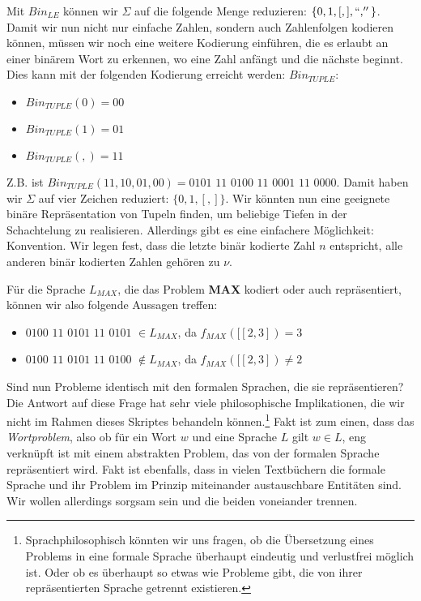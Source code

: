 Mit $Bin_{LE}$ können wir $\Sigma$ auf die folgende Menge reduzieren: $\{0, 1, [, ], ``,''\}$.
Damit wir nun nicht nur einfache Zahlen, sondern auch Zahlenfolgen kodieren können,
müssen wir noch eine weitere Kodierung einführen,
die es erlaubt an einer binärem Wort zu erkennen,
wo eine Zahl anfängt und die nächste beginnt.
Dies kann mit der folgenden Kodierung erreicht werden: 
$Bin_{TUPLE}:$ 

\begin{itemize}
    \item $Bin_{TUPLE}(0) = 00$
    \item $Bin_{TUPLE}(1) = 01$
    \item $Bin_{TUPLE}(,) = 11$
\end{itemize}
Z.B. ist $Bin_{TUPLE}(11,10,01,00) = 0101$ $11$ $0100$ $11$ $0001$ $11$ $0000$.
Damit haben wir $\Sigma$ auf vier Zeichen reduziert: $\{0,1,[,]\}$.
Wir könnten nun eine geeignete binäre Repräsentation von Tupeln finden,
um beliebige Tiefen in der Schachtelung zu realisieren.
Allerdings gibt es eine einfachere Möglichkeit: Konvention.
Wir legen fest, dass die letzte binär kodierte Zahl $n$ entspricht,
alle anderen binär kodierten Zahlen gehören zu $\nu$.

Für die Sprache $L_{MAX}$, die das Problem \textbf{MAX} kodiert oder auch repräsentiert,
können wir also folgende Aussagen treffen:
\begin{itemize}
    \item $0100$ $11$ $0101$ $11$ $0101$ $\in L_{MAX}$, da $f_{MAX}([[2,3]) = 3$
    \item $0100$ $11$ $0101$ $11$ $0100$ $\notin L_{MAX}$, da $f_{MAX}([[2,3]) \neq 2$
\end{itemize}

Sind nun Probleme identisch mit den formalen Sprachen, die sie repräsentieren? 
Die Antwort auf diese Frage hat sehr viele philosophische Implikationen,
die wir nicht im Rahmen dieses Skriptes behandeln können.\footnote{Sprachphilosophisch
könnten wir uns fragen, ob die Übersetzung eines Problems in eine formale Sprache
überhaupt eindeutig und verlustfrei möglich ist.
Oder ob es überhaupt so etwas wie Probleme gibt, die von ihrer repräsentierten Sprache 
getrennt existieren.}
Fakt ist zum einen, dass das \emph{Wortproblem}, also ob für ein Wort $w$ und eine Sprache $L$
gilt $w \in L$,
eng verknüpft ist mit einem abstrakten Problem, das von der formalen Sprache repräsentiert wird. 
Fakt ist ebenfalls, dass in vielen Textbüchern die formale Sprache und ihr Problem
im Prinzip miteinander austauschbare Entitäten sind. 
Wir wollen allerdings sorgsam sein und die beiden voneiander trennen.\\

